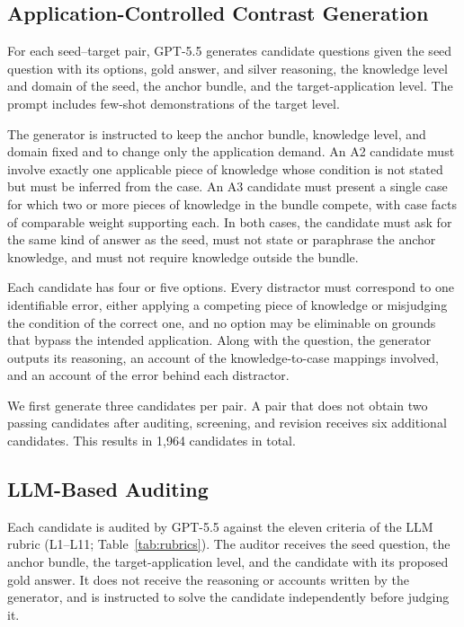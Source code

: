 \subsection{Application-Controlled Contrast Generation}

For each seed--target pair, GPT-5.5 generates candidate questions given the seed question with its options, gold answer, and silver reasoning, the knowledge level and domain of the seed, the anchor bundle, and the target-application level.
The prompt includes few-shot demonstrations of the target level.

The generator is instructed to keep the anchor bundle, knowledge level, and domain fixed and to change only the application demand.
An A2 candidate must involve exactly one applicable piece of knowledge whose condition is not stated but must be inferred from the case.
An A3 candidate must present a single case for which two or more pieces of knowledge in the bundle compete, with case facts of comparable weight supporting each.
In both cases, the candidate must ask for the same kind of answer as the seed, must not state or paraphrase the anchor knowledge, and must not require knowledge outside the bundle.

Each candidate has four or five options.
Every distractor must correspond to one identifiable error, either applying a competing piece of knowledge or misjudging the condition of the correct one, and no option may be eliminable on grounds that bypass the intended application.
Along with the question, the generator outputs its reasoning, an account of the knowledge-to-case mappings involved, and an account of the error behind each distractor.

We first generate three candidates per pair.
A pair that does not obtain two passing candidates after auditing, screening, and revision receives six additional candidates.
This results in 1,964 candidates in total.

\subsection{LLM-Based Auditing}

Each candidate is audited by GPT-5.5 against the eleven criteria of the LLM rubric (L1--L11; Table~\ref{tab:rubrics}).
The auditor receives the seed question, the anchor bundle, the target-application level, and the candidate with its proposed gold answer.
It does not receive the reasoning or accounts written by the generator, and is instructed to solve the candidate independently before judging it.


